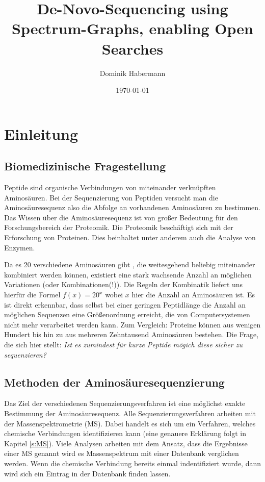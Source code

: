 \documentclass[a4paper, 12pt]{article}
\title{De-Novo-Sequencing using Spectrum-Graphs, enabling Open Searches}
\author{Dominik Habermann}
\date{\today}
\newcommand{\dashAndSpace}{\textendash \space}
\newcommand{\dashAndSpaceSeq}[1]{\dashAndSpace#1 \dashAndSpace}
\begin{document}
\maketitle

\section{Einleitung}\label{s:Einleitung}
\subsection{Biomedizinische Fragestellung}
Peptide sind organische Verbindungen von miteinander verknüpften Aminosäuren. Bei der Sequenzierung von Peptiden versucht man die Aminosäuresequenz \dashAndSpaceSeq{also die Abfolge an vorhandenen Aminosäuren} zu bestimmen. Das Wissen über die Aminosäuresequenz ist von großer Bedeutung für den Forschungsbereich der Proteomik. Die Proteomik beschäftigt sich mit der Erforschung von Proteinen. Dies beinhaltet unter anderem auch die Analyse von Enzymen.

Da es 20 verschiedene Aminosäuren gibt \cite{rudat2021alanins}, die weitesgehend beliebig miteinander kombiniert werden können, existiert eine stark wachsende Anzahl an möglichen Variationen (oder Kombinationen(!)). Die Regeln der Kombinatik liefert uns hierfür die Formel $ f(x)=20^x $ wobei $ x $ hier die Anzahl an Aminosäuren ist. Es ist direkt erkennbar, dass selbst bei einer geringen Peptidlänge die Anzahl an möglichen Sequenzen eine Größenordnung erreicht, die von Computersystemen nicht mehr verarbeitet werden kann. Zum Vergleich: Proteine können aus wenigen Hundert bis hin zu aus mehreren Zehntausend Aminosäuren bestehen. Die Frage, die sich hier stellt: \emph{Ist es zumindest für kurze Peptide mögich diese sicher zu sequenzieren?}

\subsection{Methoden der Aminosäuresequenzierung}
Das Ziel der verschiedenen Sequenzierungsverfahren ist eine möglichst exakte Bestimmung der Aminosäuresequenz. Alle Sequenzierungsverfahren arbeiten mit der Massenspektrometrie (MS). Dabei handelt es sich um ein Verfahren, welches chemische Verbindungen identifizieren kann (eine genauere Erklärung folgt in Kapitel \ref{s:MS}). Viele Analysen arbeiten mit dem Ansatz, dass die Ergebnisse einer MS \dashAndSpaceSeq{genannt wird es Massenspektrum} mit einer Datenbank verglichen werden. Wenn die chemische Verbindung bereits einmal indentifiziert wurde, dann wird sich ein Eintrag in der Datenbank finden lassen.
\end{document}
